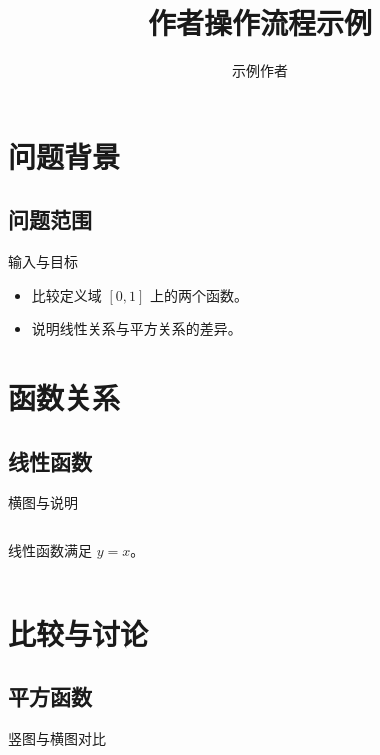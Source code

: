 \documentclass[aspectratio=169,11pt,fontset=none]{ctexbeamer}
\title[作者流程]{作者操作流程示例}
\author{示例作者}
\institute{示例单位}
\date{}
\begin{document}
\TitleSlide
\OutlineSlide[title={汇报提纲}]

\section{问题背景}
\subsection{问题范围}
\begin{frame}{输入与目标}
  \begin{itemize}
    \item 比较定义域 $[0,1]$ 上的两个函数。
    \item 说明线性关系与平方关系的差异。
  \end{itemize}
\end{frame}

\section{函数关系}
\subsection{线性函数}
\begin{frame}{横图与说明}
  \begin{columns}[T,onlytextwidth]
    \begin{column}{\hitleftwidth}
      线性函数满足 $y=x$。
    \end{column}
    \begin{column}{\hitrightwidth}
    \end{column}
  \end{columns}
\end{frame}

\section{比较与讨论}
\subsection{平方函数}
\begin{frame}{竖图与横图对比}
  \begin{columns}[T,onlytextwidth]
    \begin{column}{\hitleftwidth}
    \end{column}
    \begin{column}{\hitrightwidth}
    \end{column}
  \end{columns}
\end{frame}
\end{document}
